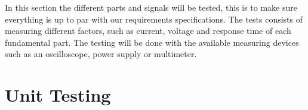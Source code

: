 In this section the different parts and signals will be tested, this is to make sure everything is up to par with our requirements specifications. The tests consists of measuring different factors, such as current, voltage and response time of each fundamental part. The testing will be done with the available measuring devices such as an oscilloscope, power supply or multimeter.


\section{Unit Testing}
 




